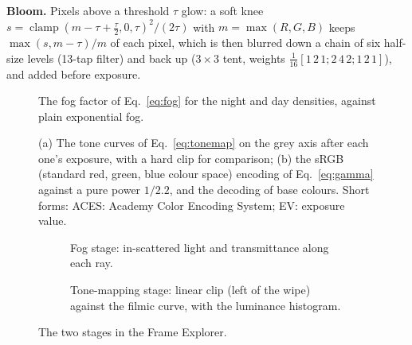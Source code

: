 \textbf{Bloom.} Pixels above a threshold $\tau$ glow: a soft knee
$s=\operatorname{clamp}(m-\tau+\tfrac\tau2,0,\tau)^2/(2\tau)$ with $m=\max(R,G,B)$ keeps $\max(s,m-\tau)/m$ of each pixel,
which is then blurred down a chain of six half-size levels (13-tap filter) and back up ($3\times3$ tent, weights
$\frac1{16}[1\,2\,1;2\,4\,2;1\,2\,1]$), and added before exposure.

\begin{figure}[htbp]
\centering{}
\caption{The fog factor of Eq.~\eqref{eq:fog} for the night and day densities, against plain exponential fog.}
\label{fig:fogcurve}
\end{figure}

\begin{figure}[htbp]
\centering{}
\caption{(a) The tone curves of Eq.~\eqref{eq:tonemap} on the grey axis after each one's exposure, with a hard clip for
comparison; (b) the sRGB (standard red, green, blue colour space) encoding of Eq.~\eqref{eq:gamma} against a pure power $1/2.2$, and the decoding of base colours. Short forms: ACES: Academy Color Encoding System; EV: exposure value.}
\label{fig:tonecurve}
\end{figure}

\begin{figure}[htbp]
\centering
\begin{subfigure}[t]{0.49\linewidth}\caption{Fog stage: in-scattered light and
transmittance along each ray.}\end{subfigure}\hfill
\begin{subfigure}[t]{0.49\linewidth}\caption{Tone-mapping stage: linear clip
(left of the wipe) against the filmic curve, with the luminance histogram.}\end{subfigure}
\caption{The two stages in the Frame Explorer.}
\label{fig:poststages}
\end{figure}

